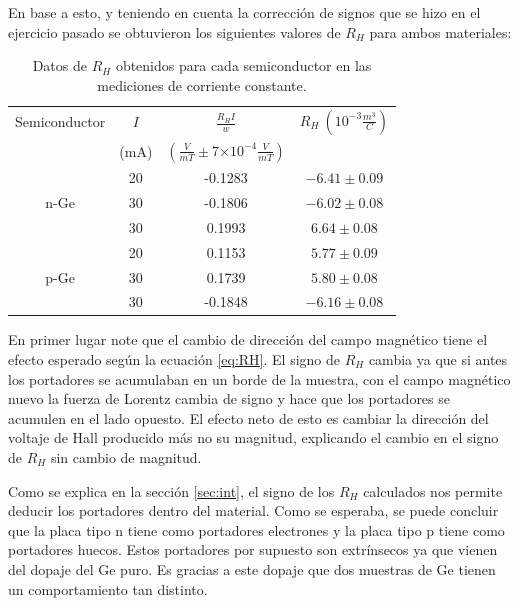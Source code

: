\documentclass[twocolumn,showkeys,preprintnumbers,amsmath,amssymb]{revtex4}
\providecommand{\e}[1]{\ensuremath{\times 10^{#1}}}
\begin{document}
\begin{widetext}
		\end{widetext}
		
		En base a esto, y teniendo en cuenta la corrección de signos que se hizo en el ejercicio pasado se obtuvieron los siguientes valores de $R_H$ para ambos materiales:
		
		\begin{table}[H]
			\centering
			\begin{tabular}{ c | c | c | c }
				Semiconductor & $I$ & $\frac{R_H I}{w}$ & $R_H \ \left( 10^{-3}\frac{m^3}{C} \right)$ \\
				& (mA) & $\left(\frac{V}{mT} \pm 7 \e{-4} \frac{V}{mT} \right)$ & \\ \hline
				\multirow{3}{*}{n-Ge} & 20 & -0.1283 & $-6.41\pm 0.09$ \\
				& 30 & -0.1806 & $-6.02\pm 0.08$ \\
				& 30 & 0.1993 & $6.64\pm 0.08$ \\ \hline
				\multirow{3}{*}{p-Ge} & 20 & 0.1153 & $5.77\pm 0.09$ \\
				& 30 & 0.1739 & $5.80\pm 0.08$ \\
				& 30 & -0.1848 & $-6.16\pm 0.08$ \\
			\end{tabular}
			\caption{Datos de $R_H$ obtenidos para cada semiconductor en las mediciones de corriente constante.}
			\label{tab:RH-IConst}
		\end{table}
		
	En primer lugar note que el cambio de dirección del campo magnético tiene el efecto esperado según la ecuación \eqref{eq:RH}. El signo de $R_H$ cambia ya que si antes los portadores se acumulaban en un borde de la muestra, con el campo magnético nuevo la fuerza de Lorentz cambia de signo y hace que los portadores se acumulen en el lado opuesto. El efecto neto de esto es cambiar la dirección del voltaje de Hall producido más no su magnitud, explicando el cambio en el signo de $R_H$ sin cambio de magnitud. 
	
	Como se explica en la sección \ref{sec:int}, el signo de los $R_H$ calculados nos permite deducir los portadores dentro del material. Como se esperaba, se puede concluir que la placa tipo n tiene como portadores electrones y la placa tipo p tiene como portadores huecos. Estos portadores por supuesto son extrínsecos ya que vienen del dopaje del Ge puro. Es gracias a este dopaje que dos muestras de Ge tienen un comportamiento tan distinto. 
	
\end{document}
